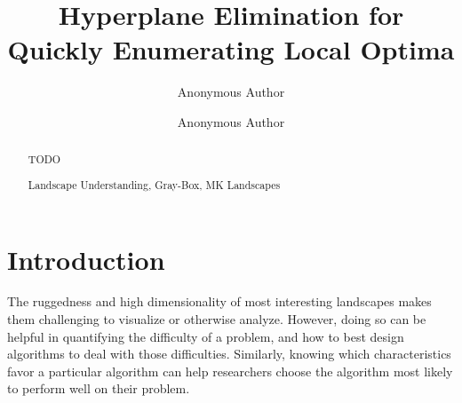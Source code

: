 \documentclass[runningheads,a4paper]{llncs}
\newcommand{\keywords}[1]{\par\addvspace\baselineskip
\noindent\keywordname\enspace\ignorespaces#1}
\begin{document}
\mainmatter  %

\title{Hyperplane Elimination for Quickly Enumerating Local Optima}


%
%
\author{Anonymous Author\and Anonymous Author}

%


%
%

\maketitle


\begin{abstract}
TODO

\keywords{Landscape Understanding, Gray-Box, MK Landscapes}
\end{abstract}


\section{Introduction}
The ruggedness and high dimensionality of most interesting landscapes makes them challenging
to visualize or otherwise analyze. However, doing so can be helpful in
quantifying the difficulty of a problem, and how to best design algorithms to deal
with those difficulties. 
Similarly, knowing which characteristics favor
a particular
algorithm can help researchers choose the algorithm
most likely to perform well on their problem.
\end{document}
